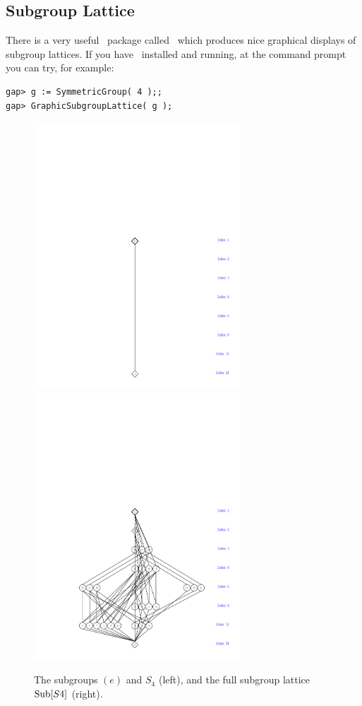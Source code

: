 \subsection{Subgroup Lattice}
There is a very useful \gap\ package called \xgap\ which produces nice graphical
displays of subgroup lattices.  If you have \xgap\ installed
and running, at the command prompt you can try, for example:
{\codesize
\begin{verbatim}
gap> g := SymmetricGroup( 4 );;
gap> GraphicSubgroupLattice( g );
\end{verbatim}
}  
\begin{figure}[!hb]
    \vspace{-4cm}
    \includegraphics[height=10cm]{trivialS4.pdf}%
    \includegraphics[height=10cm]{messyS4.pdf}%
    \caption{The subgroups $(e)$ and $S_4$ (left),
      and the full subgroup lattice $\operatorname{Sub}[S4]$ (right).}
    \label{fig:S4s}
\end{figure}
